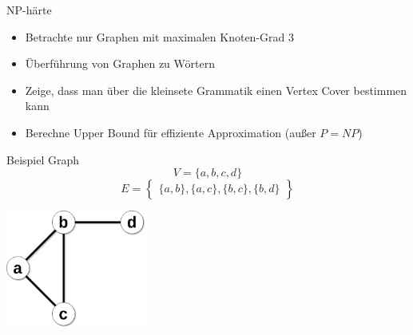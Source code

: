 \newcommand{\ExampleGraphV}{V = \{a,b,c,d\}}
\newcommand{\ExampleGraphE}{E = 
	\begin{Bmatrix}
		\{a,b\},
		\{a,c\},
		\{b,c\},
		\{b,d\}
	\end{Bmatrix}
}

\begin{frame}{\FrameName}
\begin{block}{NP-härte}
	\begin{itemize}[<+->]
			\item Betrachte nur Graphen mit maximalen Knoten-Grad 3
			\item Überführung von Graphen zu Wörtern
			\item Zeige, dass man über die kleinsete Grammatik einen Vertex Cover bestimmen kann
			\item Berechne Upper Bound für effiziente Approximation \linebreak (außer $P=NP$)
		\end{itemize}
\end{block}
\end{frame}

\begin{frame}{\FrameName}
\begin{block}{Beispiel Graph}
	\Gap
	$$\ExampleGraphV$$ 
	$$\ExampleGraphE$$
	\begin{center}
		\includegraphics[width=0.35\textwidth]{Images/VertexCover/blank}
	\end{center}
\end{block}
\end{frame}

\newcommand{\ProdRuleOne}[1]{(\# #1 \Fresh #1\#  \Fresh )^2}
\newcommand{\ProdRuleTwo}[1]{\# #1 \#  \Fresh}
\newcommand{\ProdRuleThree}[2]{\# #1 \# #2\#  \Fresh}
\newcommand{\PhantomAlpha}{\phantom{\alpha_{Beispiel} = (}}
\newcommand{\ReductionExample}{
	$
		\alpha_{Beispiel} =
		\textcolor{OrangeRed}{
			\foreach \n in {a,b,c,d}{\ProdRuleOne{\n}}
		} \linebreak
		\PhantomAlpha
		\textcolor{PineGreen}{
			\foreach \n in {a,b,c,d}{\ProdRuleTwo{\n}}
		} \linebreak
		\PhantomAlpha
		\textcolor{RoyalBlue}{
			\ProdRuleThree{a}{b}
			\ProdRuleThree{a}{c}
			\ProdRuleThree{b}{c}
			\ProdRuleThree{b}{d}
		} \linebreak
	$
}

